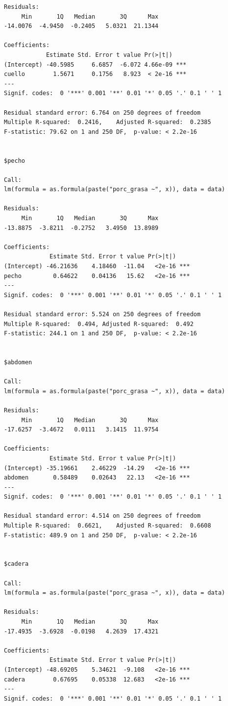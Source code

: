 \documentclass[
  letterpaper,
  DIV=11,
  numbers=noendperiod]{scrartcl}
\begin{document}
\begin{verbatim}
Residuals:
     Min       1Q   Median       3Q      Max 
-14.0076  -4.9450  -0.2405   5.0321  21.1344 

Coefficients:
            Estimate Std. Error t value Pr(>|t|)    
(Intercept) -40.5985     6.6857  -6.072 4.66e-09 ***
cuello        1.5671     0.1756   8.923  < 2e-16 ***
---
Signif. codes:  0 '***' 0.001 '**' 0.01 '*' 0.05 '.' 0.1 ' ' 1

Residual standard error: 6.764 on 250 degrees of freedom
Multiple R-squared:  0.2416,    Adjusted R-squared:  0.2385 
F-statistic: 79.62 on 1 and 250 DF,  p-value: < 2.2e-16


$pecho

Call:
lm(formula = as.formula(paste("porc_grasa ~", x)), data = data)

Residuals:
     Min       1Q   Median       3Q      Max 
-13.8875  -3.8211  -0.2752   3.4950  13.8989 

Coefficients:
             Estimate Std. Error t value Pr(>|t|)    
(Intercept) -46.21636    4.18460  -11.04   <2e-16 ***
pecho         0.64622    0.04136   15.62   <2e-16 ***
---
Signif. codes:  0 '***' 0.001 '**' 0.01 '*' 0.05 '.' 0.1 ' ' 1

Residual standard error: 5.524 on 250 degrees of freedom
Multiple R-squared:  0.494, Adjusted R-squared:  0.492 
F-statistic: 244.1 on 1 and 250 DF,  p-value: < 2.2e-16


$abdomen

Call:
lm(formula = as.formula(paste("porc_grasa ~", x)), data = data)

Residuals:
     Min       1Q   Median       3Q      Max 
-17.6257  -3.4672   0.0111   3.1415  11.9754 

Coefficients:
             Estimate Std. Error t value Pr(>|t|)    
(Intercept) -35.19661    2.46229  -14.29   <2e-16 ***
abdomen       0.58489    0.02643   22.13   <2e-16 ***
---
Signif. codes:  0 '***' 0.001 '**' 0.01 '*' 0.05 '.' 0.1 ' ' 1

Residual standard error: 4.514 on 250 degrees of freedom
Multiple R-squared:  0.6621,    Adjusted R-squared:  0.6608 
F-statistic: 489.9 on 1 and 250 DF,  p-value: < 2.2e-16


$cadera

Call:
lm(formula = as.formula(paste("porc_grasa ~", x)), data = data)

Residuals:
     Min       1Q   Median       3Q      Max 
-17.4935  -3.6928  -0.0198   4.2639  17.4321 

Coefficients:
             Estimate Std. Error t value Pr(>|t|)    
(Intercept) -48.69205    5.34621  -9.108   <2e-16 ***
cadera        0.67695    0.05338  12.683   <2e-16 ***
---
Signif. codes:  0 '***' 0.001 '**' 0.01 '*' 0.05 '.' 0.1 ' ' 1


\end{verbatim}
\end{document}
